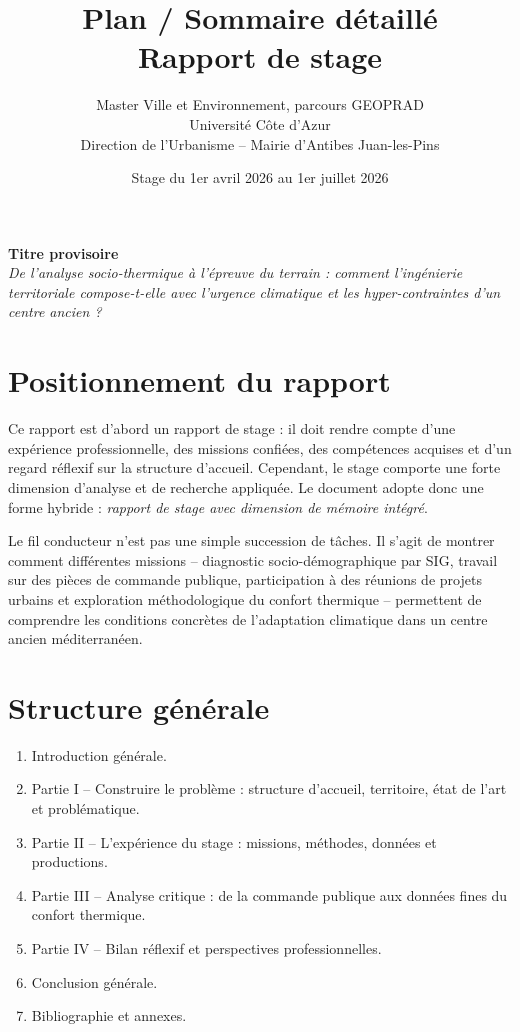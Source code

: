 \documentclass[11pt,a4paper]{article}
\title{
  \textbf{Plan / Sommaire détaillé}\\
  \large Rapport de stage
}
\author{
  Master Ville et Environnement, parcours GEOPRAD\\
  Université Côte d'Azur\\
  Direction de l'Urbanisme -- Mairie d'Antibes Juan-les-Pins
}
\date{Stage du 1er avril 2026 au 1er juillet 2026}
\begin{document}
\maketitle

\begin{center}
\textbf{Titre provisoire}\\[0.4em]
\emph{De l'analyse socio-thermique à l'épreuve du terrain : comment l'ingénierie territoriale compose-t-elle avec l'urgence climatique et les hyper-contraintes d'un centre ancien ?}
\end{center}

\tableofcontents
\newpage

\section*{Positionnement du rapport}

Ce rapport est d'abord un rapport de stage : il doit rendre compte d'une expérience professionnelle, des missions confiées, des compétences acquises et d'un regard réflexif sur la structure d'accueil. Cependant, le stage comporte une forte dimension d'analyse et de recherche appliquée. Le document adopte donc une forme hybride : \emph{rapport de stage avec dimension de mémoire intégré}.

Le fil conducteur n'est pas une simple succession de tâches. Il s'agit de montrer comment différentes missions -- diagnostic socio-démographique par SIG, travail sur des pièces de commande publique, participation à des réunions de projets urbains et exploration méthodologique du confort thermique -- permettent de comprendre les conditions concrètes de l'adaptation climatique dans un centre ancien méditerranéen.

\section*{Structure générale}

\begin{enumerate}
  \item Introduction générale.
  \item Partie I -- Construire le problème : structure d'accueil, territoire, état de l'art et problématique.
  \item Partie II -- L'expérience du stage : missions, méthodes, données et productions.
  \item Partie III -- Analyse critique : de la commande publique aux données fines du confort thermique.
  \item Partie IV -- Bilan réflexif et perspectives professionnelles.
  \item Conclusion générale.
  \item Bibliographie et annexes.
\end{enumerate}
\end{document}
